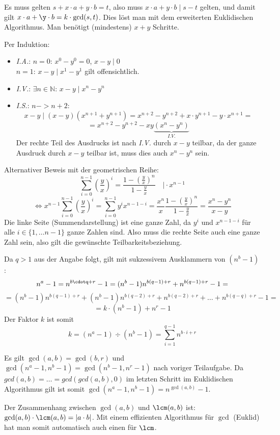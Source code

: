 \begin{flushenum}
\begin{flushalpha}
	\item Es muss gelten $s + x\cdot a + y \cdot b = t$, also muss $x\cdot a + y\cdot b \mid s-t$ gelten,
	und damit gilt $x\cdot a + \y \cdot b = k \cdot \gcd(s,t)$. Dies
	löst man mit dem erweiterten Euklidischen Algorithmus. Man benötigt (mindestens) $x+y$ Schritte.
\end{flushalpha}

\item 
\begin{flushalpha}
\item Per Induktion:
\begin{itemize}
	\item \textit{I.A.}: $n=0$: $x^0 - y^0 = 0$, $x-y \mid 0$ \\ $n=1$: $x-y \mid x^1 - y^1$ gilt offensichtlich.
	\item \textit{I.V.}: $\exists n \in \mathbb{N}$: $x-y \mid x^n - y^n$
	\item \textit{I.S.}: $n -> n+2$:
	\[ x-y \mid (x-y)(x^{n+1} + y^{n+1}) = x^{n+2} - y^{n+2} + x\cdot y^{n+1} - y \cdot x^{n+1} =\]
	\[ = x^{n+2} - y^{n+2} - xy \underbrace{(x^{n} - y^{n})}_{I.V.}\]
	Der rechte Teil des Ausdrucks ist nach \textit{I.V.} durch $x-y$ teilbar, da der ganze Ausdruck durch $x-y$ teilbar ist, muss dies auch $x^n - y^n$ sein.
\end{itemize}
Alternativer Beweis mit der geometrischen Reihe:
\[ \sum_{i=0}^{n-1}\left(\frac{y}{x}\right)^i = \frac{1-\left(\frac{y}{x}\right)^n}{1-\frac{y}{x}} \quad \vert \cdot x^{n-1}\]
\[ \Leftrightarrow x^{n-1}  \sum_{i=0}^{n-1}\left(\frac{y}{x}\right)^i = \sum_{i=0}^{n-1} y^ix^{n-1-i} = \frac{x^n}{x}  \frac{1-\left(\frac{y}{x}\right)^n}{1-\frac{y}{x}}  = \frac{x^n - y^n}{x-y} \]
Die linke Seite (Summendarstellung) ist eine ganze Zahl, da $y^i$ und $x^{n-1-i}$ für alle $i \in \{1, \ldots n-1\}$ ganze Zahlen sind. Also muss
die rechte Seite auch eine ganze Zahl sein, also gilt die gewünschte Teilbarkeitsbeziehung.

\item Da $q>1$ aus der Angabe folgt, gilt mit sukzessivem Ausklammern von $(n^b - 1)$:
\[ n^a - 1 = n^{b\cdotq + r} - 1 = (n^b - 1)n^{b(q-1) + r} + n^{b(q-1) + r} - 1 =\]\[=  (n^b - 1)n^{b(q-1) + r} + (n^b - 1)n^{b(q-2) + r} + n^{b(q-2) + r} + \ldots
+n^{b(q-q) + r} - 1 =\]\[= k \cdot (n^b-1) + n^r - 1 \]
Der Faktor $k$ ist somit \[ k = (n^a-1) \div (n^b -1) = \sum_{i=1}^{q-1} n^{b\cdot i + r} \]
\item Es gilt $\gcd(a,b) = \gcd(b,r)$ und $\gcd(n^a-1,n^b-1) = \gcd(n^b-1,n^r-1)$ nach voriger Teilaufgabe.
Da $gcd(a,b) = \ldots = gcd( gcd(a,b), 0)$ im letzten Schritt im Euklidischen Algorithmus gilt ist somit $\gcd(n^a -1,n^b-1) = n^{\gcd(a,b)}-1$.
\end{flushalpha}
\item Der Zusammenhang zwischen $\gcd(a,b)$ und $\lcm(a,b)$ ist: $\gcd(a,b) \cdot \lcm(a,b) = |a \cdot b|$. Mit einem effizienten Algorithmus für $\gcd$ (Euklid)
hat man somit automatisch auch einen für $\lcm$.


\end{flushenum}

